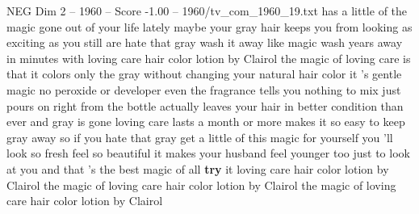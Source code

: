 \begin{textsample}{NEG Dim 2 – 1960 – Score -1.00 – 1960/tv\_com\_1960\_19.txt}  \label{ex:f2_neg_077}
has a little of the magic gone out of your life lately maybe your gray hair keeps you from looking as exciting as you still are hate that gray wash it away like magic wash years away in minutes with loving care hair color lotion by Clairol the magic of loving care is that it colors only the gray without changing your natural hair color it 's gentle magic no peroxide or developer even the fragrance tells you nothing to mix just pours on right from the bottle actually leaves your hair in better condition than ever and gray is gone loving care lasts a month or more makes it so easy to keep gray away so if you hate that gray get a little of this magic for yourself you 'll look so fresh feel so beautiful it makes your husband feel younger too just to look at you and that 's the best magic of all \textbf{try} it loving care hair color lotion by Clairol the magic of loving care hair color lotion by Clairol the magic of loving care hair color lotion by Clairol

\end{textsample}
